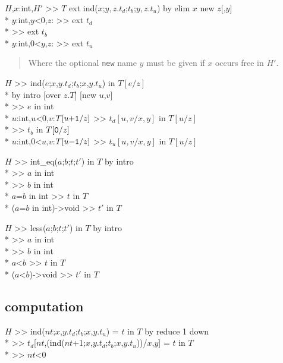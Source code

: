 \goal $H$,$x$:int,$H'$ >> $T$  
           ext ind($x$;$y,z$.$t_d$;$t_b$;$y,z$.$t_u$)
           by elim $x$ new $z$[,$y$]\\*
\subgoal $y$:int,$y$<0,$z$:
      >>  ext $t_d$ \\*
\subgoal >>  ext $t_b$ \\*
\subgoal $y$:int,0<$y$,$z$:
      >>  ext $t_u$
\begin{quote}\rm
Where the optional {\tt new} name $y$ must be given if $x$ occurs free in $H'$.
\end{quote}

\goal $H$ >> ind($e$;$x$,$y$.$t_d$;$t_b$;$x$,$y$.$t_u$) in $T[e/z]$ \\*
\continuegoal by intro [over $z$.$T$] [new $u$,$v$] \\*
\subgoal  >> $e$ in int \\*
\subgoal $u$:int,$u$<0,$v$:$T[u{\tt +1}/z]$ >> $t_d[u,v/x,y]$ in $T[u/z]$ \\*
\subgoal >> $t_b$ in $T[{\tt 0}/z]$ \\*                      
\subgoal $u$:int,0<$u$,$v$:$T[u{\tt -1}/z]$ >> $t_u[u,v/x,y]$ in $T[u/z]$

\goalskip

\goal $H$ >> int\_eq($a$;$b$;$t$;$t'$) in $T$ by intro \\*
\subgoal >> $a$ in int \\*
\subgoal >> $b$ in int \\*
\subgoal $a$=$b$ in int >> $t$ in $T$ \\*
\subgoal ($a$=$b$ in int)->void >> $t'$ in $T$
 
\goalskip

\goal $H$ >> less($a$;$b$;$t$;$t'$) in $T$ by intro \\*
\subgoal >> $a$ in int \\*
\subgoal >> $b$ in int \\*
\subgoal $a$<$b$ >> $t$ in $T$ \\*
\subgoal ($a$<$b$)->void >> $t'$ in $T$

\subsection*{computation}
\goalgroup $H$ >> ind($nt$;$x$,$y$.$t_d$;$t_b$;$x$,$y$.$t_u$) = $t$ in $T$
           by reduce 1 down\\*
\subgoal >> $t_d$[$nt$,(ind($nt$+1;$x$,$y$.$t_d$;$t_b$;$x$,$y$.$t_u$))/$x$,$y$] = $t$ in $T$ \\*
\subgoal >> $nt$<0

